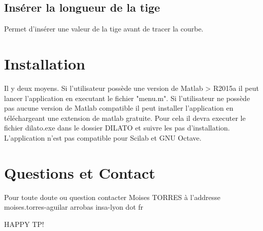 \documentclass[11pt]{article}
\begin{document}
\subsection*{Insérer la longueur de la tige}
\label{sec-2-2}
Permet d'insérer une valeur de la tige avant de tracer la courbe.

\section{Installation}
\label{sec-3}
Il y deux moyens. Si l'utilisateur possède une version de Matlab > R2015a il peut lancer l'application en executant le fichier "menu.m".
Si l'utilisateur ne possède pas aucune version de Matlab compatible il peut installer l'application en téléchargeant une extension de matlab gratuite.
Pour cela il devra executer le fichier dilato.exe dans le dossier DILATO et suivre les pas d'installation. L'application n'est pas compatible pour Scilab et GNU Octave.
\section{Questions et Contact}
\label{sec-4}
Pour toute doute ou question contacter Moises TORRES à l'addresse moises.torres-aguilar arrobas insa-lyon dot fr


HAPPY TP!
\end{document}
